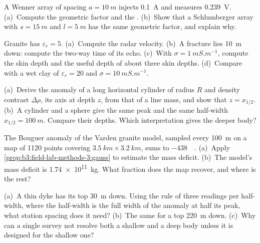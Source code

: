 \begin{exercise}[$\star$]\label{exo:b3:field-lab-methods-3:3}
A Wenner array of spacing $a = \qty{10}{m}$ injects \qty{0.1}{A} and
measures \qty{0.239}{V}. (a)~Compute the geometric factor and the
. (b)~Show that a Schlumberger array with $s =
\qty{15}{m}$ and $l = \qty{5}{m}$ has the same geometric factor, and
explain why.
\end{exercise}

\begin{exercise}[$\star$]\label{exo:b3:field-lab-methods-3:4}
Granite has $\varepsilon_r = 5$. (a)~Compute the radar velocity. (b)~A
fracture lies \qty{10}{m} down: compute the two-way time of its echo.
(c)~With $\sigma = \qty{1}{mS.m^{-1}}$, compute the skin depth and the
useful depth of about three skin depths. (d)~Compare with a wet clay of
$\varepsilon_r = 20$ and $\sigma = \qty{10}{mS.m^{-1}}$.
\end{exercise}

\begin{exercise}[$\star\star$]\label{exo:b3:field-lab-methods-3:5}
(a)~Derive the anomaly of a long horizontal cylinder of radius $R$ and
density contrast $\Delta\rho$, its axis at depth $z$, from that of a
line mass, and show that $z = x_{1/2}$. (b)~A cylinder and a sphere
give the same peak and the same half-width $x_{1/2} = \qty{100}{m}$.
Compare their depths. Which interpretation gives the deeper body?
\end{exercise}

\begin{exercise}[$\star\star$]\label{exo:b3:field-lab-methods-3:6}
The Bouguer anomaly of the Varden granite model, sampled every
\qty{100}{m} on a map of \num{1120} points covering $\qty{3.5}{km}
\times \qty{3.2}{km}$, sums to \qty{-438}{\milli\gal}. (a)~Apply
\cref{prop:b3:field-lab-methods-3:gauss} to estimate the mass deficit.
(b)~The model's mass deficit is \qty{1.74e11}{kg}. What fraction does
the map recover, and where is the rest?
\end{exercise}

\begin{exercise}[$\star\star$]\label{exo:b3:field-lab-methods-3:7}
(a)~A thin dyke has its top \qty{30}{m} down. Using the rule of three
readings per half-width, where the half-width is the full width of the
anomaly at half its peak, what station spacing does it need? (b)~The
same for a top \qty{220}{m} down. (c)~Why can a single survey not
resolve both a shallow and a deep body unless it is designed for the
shallow one?
\end{exercise}

